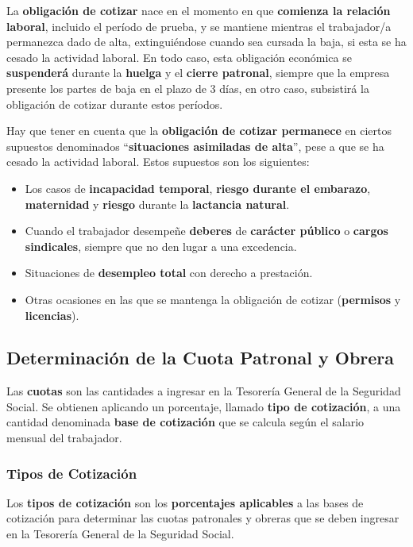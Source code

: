 La \textbf{obligación de cotizar} nace en el momento en que \textbf{comienza la relación laboral}, incluido el período de prueba, y se mantiene mientras el trabajador/a permanezca dado de alta, extinguiéndose cuando sea cursada la baja, si esta se ha cesado la actividad laboral. En todo caso, esta obligación económica se \textbf{suspenderá} durante la \textbf{huelga} y el \textbf{cierre patronal}, siempre que la empresa presente los partes de baja en el plazo de 3 días, en otro caso, subsistirá la obligación de cotizar durante estos períodos.

Hay que tener en cuenta que la \textbf{obligación de cotizar permanece} en ciertos supuestos denominados ``\textbf{situaciones asimiladas de alta}'', pese a que se ha cesado la actividad laboral. Estos supuestos son los siguientes:

\begin{itemize}
    \item Los casos de \textbf{incapacidad temporal}, \textbf{riesgo durante el embarazo}, \textbf{maternidad} y \textbf{riesgo} durante la \textbf{lactancia natural}.
    \item Cuando el trabajador desempeñe \textbf{deberes} de \textbf{carácter público} o \textbf{cargos sindicales}, siempre que no den lugar a una excedencia.
    \item Situaciones de \textbf{desempleo total} con derecho a prestación.
    \item Otras ocasiones en las que se mantenga la obligación de cotizar (\textbf{permisos} y \textbf{licencias}).
\end{itemize}


\subsection{Determinación de la Cuota Patronal y Obrera}
Las \textbf{cuotas} son las cantidades a ingresar en la Tesorería General de la Seguridad Social. Se obtienen aplicando un porcentaje, llamado \textbf{tipo de cotización}, a una cantidad denominada \textbf{base de cotización} que se calcula según el salario mensual del trabajador.

\subsubsection{Tipos de Cotización}
Los \textbf{tipos de cotización }son los \textbf{porcentajes aplicables} a las bases de cotización para determinar las cuotas patronales y obreras que se deben ingresar en la Tesorería General de la Seguridad Social.

